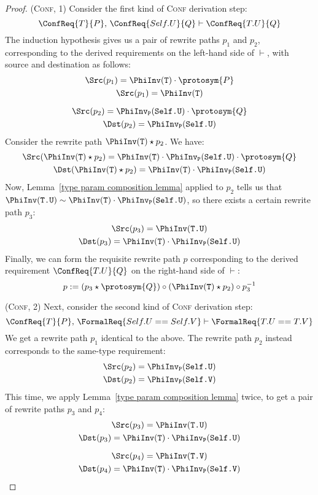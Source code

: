 \documentclass[../generics]{subfiles}
\begin{document}
\begin{proof}
(\textsc{Conf}, 1) Consider the first kind of \textsc{Conf} derivation step:
\[\ConfReq{T}{P},\,\ConfReq{Self.U}{Q}\vdash\ConfReq{T.U}{Q}\]
The induction hypothesis gives us a pair of rewrite paths $p_1$ and $p_2$, corresponding to the derived requirements on the left-hand side of $\vdash$, with source and destination as follows:
\begin{gather*}
\Src(p_1)=\PhiInv(\texttt{T})\cdot\protosym{P}\\
\Src(p_1)=\PhiInv(\texttt{T})\\[\medskipamount]
\Src(p_2)=\PhiInv_\texttt{P}(\texttt{Self.U})\cdot\protosym{Q}\\
\Dst(p_2)=\PhiInv_\texttt{P}(\texttt{Self.U})
\end{gather*}
Consider the rewrite path $\PhiInv(\texttt{T})\star p_2$. We have:
\begin{gather*}
\Src(\PhiInv(\texttt{T})\star p_2)= \PhiInv(\texttt{T})\cdot\PhiInv_\texttt{P}(\texttt{Self.U})\cdot\protosym{Q}\\
\Dst(\PhiInv(\texttt{T})\star p_2)= \PhiInv(\texttt{T})\cdot\PhiInv_\texttt{P}(\texttt{Self.U})
\end{gather*}
Now, Lemma~\ref{type param composition lemma} applied to $p_2$ tells us that $\PhiInv(\texttt{T.U})\sim\PhiInv(\texttt{T})\cdot\PhiInv_\texttt{P}(\texttt{Self.U})$, so there exists a certain rewrite path $p_3$:
\begin{gather*}
\Src(p_3) = \PhiInv(\texttt{T.U})\\
\Dst(p_3) = \PhiInv(\texttt{T})\cdot\PhiInv_\texttt{P}(\texttt{Self.U})
\end{gather*}
Finally, we can form the requisite rewrite path $p$ corresponding to the derived requirement $\ConfReq{T.U}{Q}$ on the right-hand side of $\vdash$:
\[p := (p_3\star\protosym{Q}) \circ (\PhiInv(\texttt{T})\star p_2) \circ p_3^{-1}\]

(\textsc{Conf}, 2) Next, consider the second kind of \textsc{Conf} derivation step:
\[\ConfReq{T}{P},\,\FormalReq{Self.U == Self.V}\vdash\FormalReq{T.U == T.V}\]
We get a rewrite path $p_1$ identical to the above. The rewrite path $p_2$ instead corresponds to the same-type requirement:
\begin{gather*}
\Src(p_2)=\PhiInv_\texttt{P}(\texttt{Self.U})\\
\Dst(p_2)=\PhiInv_\texttt{P}(\texttt{Self.V})
\end{gather*}
This time, we apply Lemma~\ref{type param composition lemma} twice, to get a pair of rewrite paths $p_3$ and $p_4$:
\begin{gather*}
\Src(p_3) = \PhiInv(\texttt{T.U})\\
\Dst(p_3) = \PhiInv(\texttt{T})\cdot\PhiInv_\texttt{P}(\texttt{Self.U})\\[\medskipamount]
\Src(p_4) = \PhiInv(\texttt{T.V})\\
\Dst(p_4) = \PhiInv(\texttt{T})\cdot\PhiInv_\texttt{P}(\texttt{Self.V})
\end{gather*}


\end{proof}
\end{document}
